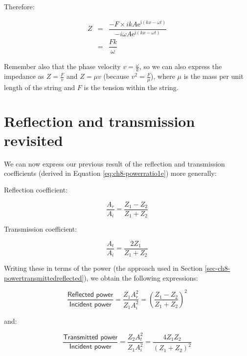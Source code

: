 \documentclass[
]{book}
\begin{document}
Therefore:

\begin{equation}
\begin{array}{rcl}
Z &=& \dfrac{-F \times ik A \mathrm{e}^{\mathrm{i}(kx - \omega t)}}{-i \omega A \mathrm{e}^{\mathrm{i}(kx - \omega t)}}\\
  &=& \dfrac{Fk}{\omega}
\end{array}
\end{equation}

Remember also that the phase velocity \(v = \frac{\omega}{k}\), so we can also express the impedance as \(Z = \frac{F}{v}\) and \(Z = \mu v\) (because \(v^2 = \frac{F}{\mu}\)), where \(\mu\) is the mass per unit length of the string and \(F\) is the tension within the string.

\hypertarget{sec-ch8-reflecttrans2}{%
\section{Reflection and transmission revisited}\label{sec-ch8-reflecttrans2}}

We can now express our previous result of the reflection and transmission coefficients (derived in Equation \eqref{eq:ch8-powerratio1e}) more generally:

Reflection coefficient:

\begin{equation}
\frac{A_r}{A_i} = \frac{Z_1 - Z_2}{Z_1 + Z_2}
\label{eq:ch8-reflectioncoeff1}
\end{equation}

Transmission coefficient:

\begin{equation}
\frac{A_t}{A_i} = \frac{2 Z_1 }{Z_1 + Z_2}
\label{eq:ch8-transmissioncoeff1}
\end{equation}

Writing these in terms of the power (the approach used in Section \ref{sec-ch8-powertransmittedreflected}), we obtain the following expressions:

\begin{equation}
\frac{\textsf{Reflected power}}{\textsf{Incident power}} = \frac{Z_1 A_r^2}{ Z_1 A_i^2} = \left(\frac{Z_1 - Z_2}{Z_1 + Z_2}\right)^2
\label{eq:ch8-reflectioncoeff2}
\end{equation}

and:

\begin{equation}
\frac{\textsf{Transmitted power}}{\textsf{Incident power}} = \frac{Z_2 A_t^2}{ Z_1 A_i^2} = \frac{4 Z_1 Z_2}{(Z_1 + Z_2)^2}
\label{eq:ch8-transmissioncoeff2}
\end{equation}
\end{document}
